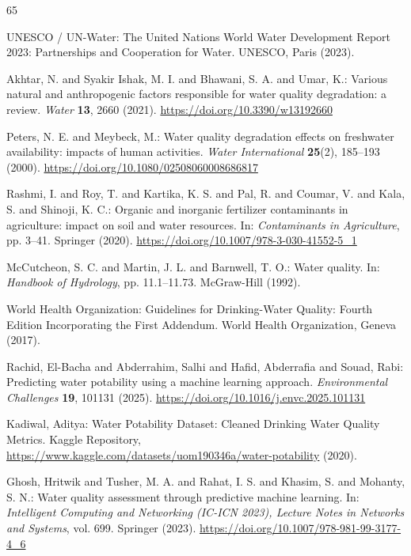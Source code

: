 \documentclass[pdflatex,sn-mathphys-num]{sn-jnl}%
\theoremstyle{thmstyleone}%
\theoremstyle{thmstyletwo}%
\theoremstyle{thmstylethree}%
\begin{document}
\clearpage
\begin{thebibliography}{65}
\ifx \doiurl \undefined \def \doiurl#1{\url{https://doi.org/#1}}\fi

UNESCO / UN-Water: The United Nations World Water Development Report 2023: Partnerships and Cooperation for Water.
UNESCO, Paris (2023).

Akhtar, N. and Syakir Ishak, M. I. and Bhawani, S. A. and Umar, K.: Various natural and anthropogenic factors responsible for water quality degradation: a review.
\textit{Water} \textbf{13}, 2660 (2021).
\doiurl{10.3390/w13192660}

Peters, N. E. and Meybeck, M.: Water quality degradation effects on freshwater availability: impacts of human activities.
\textit{Water International} \textbf{25}(2), 185--193 (2000).
\doiurl{10.1080/02508060008686817}

Rashmi, I. and Roy, T. and Kartika, K. S. and Pal, R. and Coumar, V. and Kala, S. and Shinoji, K. C.: Organic and inorganic fertilizer contaminants in agriculture: impact on soil and water resources.
In: \textit{Contaminants in Agriculture}, pp. 3--41. Springer (2020).
\doiurl{10.1007/978-3-030-41552-5_1}

McCutcheon, S. C. and Martin, J. L. and Barnwell, T. O.: Water quality.
In: \textit{Handbook of Hydrology}, pp. 11.1--11.73. McGraw-Hill (1992).

World Health Organization: Guidelines for Drinking-Water Quality: Fourth Edition Incorporating the First Addendum.
World Health Organization, Geneva (2017).

Rachid, El-Bacha and Abderrahim, Salhi and Hafid, Abderrafia and Souad, Rabi: Predicting water potability using a machine learning approach.
\textit{Environmental Challenges} \textbf{19}, 101131 (2025).
\doiurl{10.1016/j.envc.2025.101131}

Kadiwal, Aditya: Water Potability Dataset: Cleaned Drinking Water Quality Metrics.
Kaggle Repository, \url{https://www.kaggle.com/datasets/uom190346a/water-potability} (2020).

Ghosh, Hritwik and Tusher, M. A. and Rahat, I. S. and Khasim, S. and Mohanty, S. N.: Water quality assessment through predictive machine learning.
In: \textit{Intelligent Computing and Networking (IC-ICN 2023), Lecture Notes in Networks and Systems}, vol. 699. Springer (2023).
\doiurl{10.1007/978-981-99-3177-4_6}


\end{thebibliography}
\end{document}

